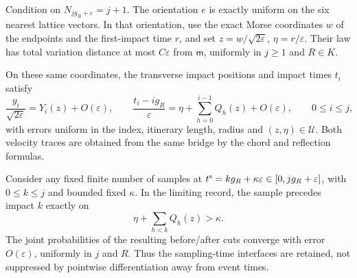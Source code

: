 \begin{theorem}\label{thm:record}
Condition on $N_{jg_R+\varepsilon}=j+1$. The orientation $e$ is exactly
uniform on the six nearest lattice vectors. In that orientation, use
the exact Morse coordinates $w$ of the endpoints and the first-impact
time $r$, and set $z=w/\sqrt{2\varepsilon}$, $\eta=r/\varepsilon$.
Their law has total variation distance at most $C\varepsilon$ from
$\mathsf m$, uniformly in $j\ge1$ and $R\in K$.

On these same coordinates, the transverse impact positions and impact
times $t_i$ satisfy
\begin{equation}\label{eq:record-asymptotic}
 \frac{y_i}{\sqrt{2\varepsilon}}=Y_i(z)+O(\varepsilon),\qquad
 \frac{t_i-ig_R}{\varepsilon}
       =\eta+\sum_{h=0}^{i-1}Q_h(z)+O(\varepsilon),
 \qquad 0\le i\le j,
\end{equation}
with errors uniform in the index, itinerary length, radius and
$(z,\eta)\in\mathcal U$. Both velocity traces are obtained from the
same bridge by the chord and reflection formulas.

Consider any fixed finite number of samples at
$t^{\rm s}=kg_R+\kappa\varepsilon\in[0,jg_R+\varepsilon]$, with
$0\le k\le j$ and bounded fixed $\kappa$. In the limiting record, the
sample precedes impact $k$ exactly on
\begin{equation}\label{eq:sample-cut}
 \eta+\sum_{h<k}Q_h(z)>\kappa.
\end{equation}
The joint probabilities of the resulting before/after cuts converge
with error $O(\varepsilon)$, uniformly in $j$ and $R$. Thus the
sampling-time interfaces are retained, not suppressed by pointwise
differentiation away from event times.
\end{theorem}
